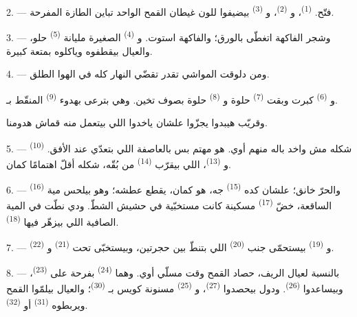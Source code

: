 2. ---  فتّح.  \textsuperscript{(1)}،
و \textsuperscript{(2)}، و \textsuperscript{(3)}
بيضيفوا للون غيطان القمح الواحد تباين  الطازة المفرحة.

3. --- وشجر الفاكهة اتغطّى بالورق؛ والفاكهة استوت. و
\textsuperscript{(4)} الصغيرة مليانة  \textsuperscript{(5)} حلو، والعيال
بيقطفوه وياكلوه بمتعة كبيرة.

4. --- ومن دلوقت المواشي تقدر تقضّي النهار كله في الهوا الطلق.

و \textsuperscript{(6)} كبرت وبقت  \textsuperscript{(7)}
حلوة و \textsuperscript{(8)} حلوة بصوف تخين. وهي بترعى بهدوء
  \textsuperscript{(9)} المنقّط بـ.

وقريّب هيبدوا يجزّوا  علشان ياخدوا  اللي
بيتعمل منه قماش هدومنا.

\VUsaut{5.0mm}
\VUsaut{3.4mm}

5. ---  \textsuperscript{(10)} شكله مش واخد باله منهم أوي. هو مهتم بس
بالعاصفة اللي بتعدّي عند الأفق. و \textsuperscript{(13)}، اللي
بيقرّب  \textsuperscript{(14)} من بُقّه، شكله أقلّ اهتمامًا كمان.

6. --- والحرّ خانق؛ علشان كده  \textsuperscript{(15)} جه، هو كمان،
يقطع عطشه؛ وهو بيلحس مية  \textsuperscript{(16)} الساقعة، خضّ
 \textsuperscript{(17)} مسكينة كانت مستخبّية في حشيش الشطّ. ودي نطّت
في المية الصافية اللي بيزهّر فيها  \textsuperscript{(18)}.

7. --- و \textsuperscript{(19)} بيستحمّى جنب 
\textsuperscript{(20)} اللي بتنطّ بين حجرتين، وبيستخبّى تحت  \textsuperscript{(21)} و \textsuperscript{(22)}.

\VUsaut{5.0mm}
\VUsaut{3.4mm}

8. --- بالنسبة لعيال الريف، حصاد القمح وقت مسلّي أوي. وهما 
\textsuperscript{(24)} بفرحة على  \textsuperscript{(23)}، وبيساعدوا
 \textsuperscript{(26)}. ودول بيحصدوا 
\textsuperscript{(27)}، و \textsuperscript{(25)} مسنونة كويس
بـ \textsuperscript{(30)}؛ والعيال بيلمّوا القمح ويربطوه
 \textsuperscript{(31)} أو  \textsuperscript{(32)}.

